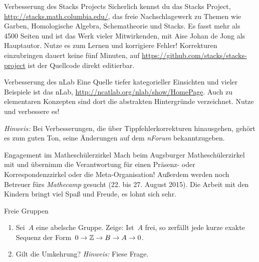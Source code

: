 \documentclass{uebblatt}
\begin{document}

\vspace{8cm}

\begin{aufgabe}{Verbesserung des Stacks Projects}
Sicherlich kennst du das Stacks Project,
\url{http://stacks.math.columbia.edu/}, das freie Nachschlagewerk zu Themen wie
Garben, Homologische Algebra, Schematheorie und Stacks. Es fasst mehr als 4500
Seiten und ist das Werk vieler Mitwirkenden, mit Aise Johan de
Jong als Hauptautor. Nutze es zum Lernen und korrigiere Fehler! Korrekturen
einzubringen dauert keine fünf Minuten, auf
\url{https://github.com/stacks/stacks-project} ist der Quellcode direkt
editierbar.
\end{aufgabe}

\begin{aufgabe}{Verbesserung des nLab}
Eine Quelle tiefer kategorieller Einsichten und vieler Beispiele ist das nLab,
\url{http://ncatlab.org/nlab/show/HomePage}. Auch zu elementaren Konzepten sind
dort die abstrakten Hintergründe verzeichnet. Nutze und verbessere es!

{\tiny\emph{Hinweis:} Bei Verbesserungen, die über Tippfehlerkorrekturen
hinausgehen, gehört es zum guten Ton, seine Änderungen auf dem \emph{nForum}
bekanntzugeben.\par}
\end{aufgabe}

\begin{aufgabe}{Engagement im Matheschülerzirkel}
Mach beim Augsburger Matheschülerzirkel mit und übernimm die Verantwortung für
einen Präsenz- oder Korrespondenzzirkel oder die Meta-Organisation!
Außerdem werden noch Betreuer fürs \emph{Mathecamp} gesucht (22. bis 27. August
2015). Die Arbeit mit den Kindern bringt viel Spaß und Freude, es lohnt sich sehr.
\end{aufgabe}

\begin{aufgabe}{Freie Gruppen}
\begin{enumerate}
\item Sei~$A$ eine abelsche Gruppe. Zeige: Ist~$A$ frei, so zerfällt jede kurze
exakte Sequenz der Form~$0 \to \mathbb{Z} \to B \to A \to 0$.
\item Gilt die Umkehrung? {\tiny\emph{Hinweis:} Fiese Frage.}
\end{enumerate}
\end{aufgabe}
\end{document}
